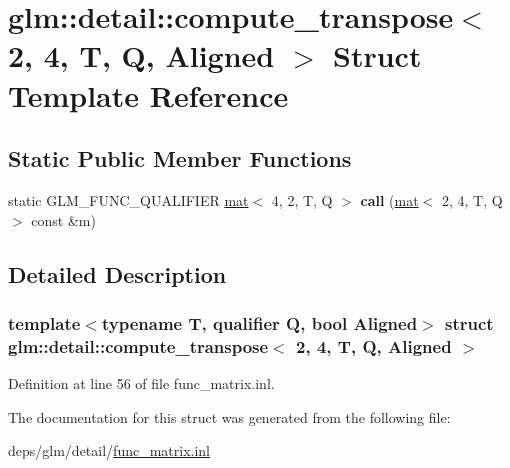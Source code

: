 \hypertarget{structglm_1_1detail_1_1compute__transpose_3_012_00_014_00_01T_00_01Q_00_01Aligned_01_4}{}\section{glm\+:\+:detail\+:\+:compute\+\_\+transpose$<$ 2, 4, T, Q, Aligned $>$ Struct Template Reference}
\label{structglm_1_1detail_1_1compute__transpose_3_012_00_014_00_01T_00_01Q_00_01Aligned_01_4}
\subsection*{Static Public Member Functions}
\begin{DoxyCompactItemize}
\item 
\mbox{\label{structglm_1_1detail_1_1compute__transpose_3_012_00_014_00_01T_00_01Q_00_01Aligned_01_4_a520d7f20fa96a98fd40229e593ac0b2a}} 
static G\+L\+M\+\_\+\+F\+U\+N\+C\+\_\+\+Q\+U\+A\+L\+I\+F\+I\+ER \hyperlink{structglm_1_1mat}{mat}$<$ 4, 2, T, Q $>$ {\bfseries call} (\hyperlink{structglm_1_1mat}{mat}$<$ 2, 4, T, Q $>$ const \&m)
\end{DoxyCompactItemize}


\subsection{Detailed Description}
\subsubsection*{template$<$typename T, qualifier Q, bool Aligned$>$\newline
struct glm\+::detail\+::compute\+\_\+transpose$<$ 2, 4, T, Q, Aligned $>$}



Definition at line 56 of file func\+\_\+matrix.\+inl.



The documentation for this struct was generated from the following file\+:\begin{DoxyCompactItemize}
\item 
deps/glm/detail/\hyperlink{func__matrix_8inl}{func\+\_\+matrix.\+inl}\end{DoxyCompactItemize}
